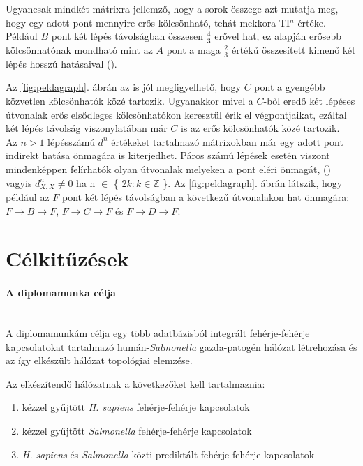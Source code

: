 \documentclass[a4paper,12pt]{article}
\begin{document}
	Ugyancsak mindkét mátrixra jellemző, hogy a sorok összege azt mutatja meg, hogy egy adott pont mennyire erős kölcsönható, tehát mekkora TI$^n$ értéke. Például $B$ pont két lépés távolságban összesen $\frac{4}{3}$ erővel hat, ez alapján erősebb kölcsönhatónak mondható mint az $A$ pont a maga $\frac{2}{3}$ értékű összesített kimenő két lépés hosszú hatásaival (\cite{ti}).
	
	Az \ref{fig:peldagraph}. ábrán az is jól megfigyelhető, hogy $C$ pont a gyengébb közvetlen kölcsönhatók közé tartozik. Ugyanakkor mivel a $C$-ből eredő két lépéses útvonalak erős elsődleges kölcsönhatókon keresztül érik el végpontjaikat, ezáltal két lépés távolság viszonylatában már $C$ is az erős kölcsönhatók közé tartozik. \\
	\indent Az $n > 1$ lépésszámú $d^n$ értékeket tartalmazó mátrixokban már egy adott pont indirekt hatása önmagára is kiterjedhet. Páros számú lépések esetén viszont mindenképpen felírhatók olyan útvonalak melyeken a pont eléri önmagát, (\cite{ti}) vagyis $d^n_{X,X} \neq 0$ ha n $\in$ \{ $2k :  k \in \mathbb{Z}$ \}. Az \ref{fig:peldagraph}. ábrán látszik, hogy például az $F$ pont két lépés távolságban a következű útvonalakon hat önmagára: $F \rightarrow B \rightarrow F$, $F \rightarrow C \rightarrow F$ és  $F \rightarrow D \rightarrow F$.
 	 \pagebreak

\section{Célkitűzések}
	\paragraph{A diplomamunka célja} \mbox{}\\
	A diplomamunkám célja egy több adatbázisból integrált fehérje-fehérje kapcsolatokat tartalmazó humán-\textit{Salmonella} gazda-patogén hálózat létrehozása és az így elkészült hálózat topológiai elemzése.
	
	
	Az elkészítendő hálózatnak a következőket kell tartalmaznia:  
	\begin{enumerate}
			\item kézzel gyűjtött  \textit{H. sapiens} fehérje-fehérje kapcsolatok
			\item kézzel gyűjtött  \textit{Salmonella} fehérje-fehérje kapcsolatok
			\item \textit{H. sapiens} és \textit{Salmonella} közti prediktált fehérje-fehérje kapcsolatok
	\end{enumerate}
	
\end{document}
